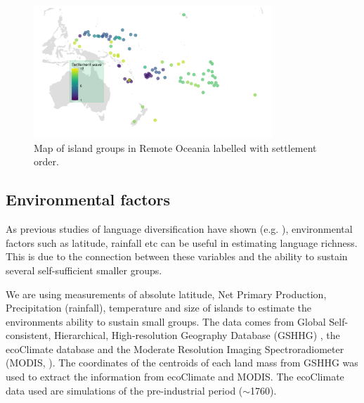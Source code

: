 \documentclass[unnumsec,webpdf,modern,medium]{oup-authoring-template}
\begin{document}
\begin{appendices}
\begin{figure}
\centering
\includegraphics[width=0.8\textwidth]{Map_RO_dates}
\caption{{Map of island groups in Remote Oceania labelled with settlement order.}}
\label{dates_map}
\end{figure}

\FloatBarrier
\subsection{Environmental factors} 
\label{appendix_environ}
As previous studies of language diversification have shown (e.g. \citet{ greenhill2015demographic, gavin2017process, Pacheco_Coelho_2019, hua2019ecological}), environmental factors such as latitude, rainfall etc can be useful in estimating language richness. This is due to the connection between these variables and the ability to sustain several self-sufficient smaller groups.


We are using measurements of absolute latitude, Net Primary Production, Precipitation (rainfall), temperature and size of islands to estimate the environments ability to sustain small groups. The data comes from Global Self-consistent, Hierarchical, High-resolution Geography Database (GSHHG) \citep{wessel1996global}, the ecoClimate database \citep{ecoclimate} and the Moderate Resolution Imaging Spectroradiometer (MODIS, \citet{running2021modis_terra, running2021modis_aqua}). The coordinates of the centroids of each land mass from GSHHG was used to extract the information from ecoClimate and MODIS. The ecoClimate data used are simulations of the pre-industrial period ($\sim$1760).


\end{appendices}
\end{document}
